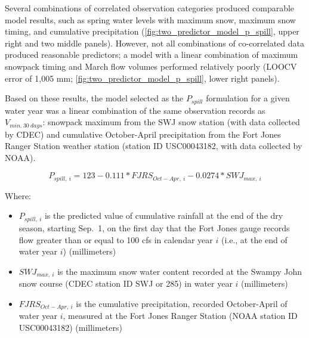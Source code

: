 \documentclass[hess, manuscript]{copernicus}
\providecommand{\tightlist}{%
  \setlength{\itemsep}{0pt}\setlength{\parskip}{0pt}}
\begin{document}
Several combinations of correlated observation categories produced
comparable model results, such as spring water levels with maximum snow,
maximum snow timing, and cumulative precipitation
(\autoref{fig:two_predictor_model_p_spill}, upper right and two middle
panels). However, not all combinations of co-correlated data produced
reasonable predictors; a model with a linear combination of maximum
snowpack timing and March flow volumes performed relatively poorly
(LOOCV error of 1,005 mm; \autoref{fig:two_predictor_model_p_spill},
lower right panels).

Based on these results, the model selected as the \(P_{spill}\)
formulation for a given water year was a linear combination of the same
observation records as \(V_{min.~30~days}\): snowpack maximum from the
SWJ snow station (with data collected by CDEC) and cumulative
October-April precipitation from the Fort Jones Ranger Station weather
station (station ID USC00043182, with data collected by NOAA).

\[P_{spill,~i} = 123 -0.111 * FJRS_{Oct-Apr,~i} - 0.0274* SWJ_{max,~i}\]

Where:

\begin{itemize}
\tightlist
\item
  \(P_{spill,~i}\) is the predicted value of cumulative rainfall at the
  end of the dry season, starting Sep.~1, on the first day that the Fort
  Jones gauge records flow greater than or equal to 100 cfs in calendar
  year \(i\) (i.e., at the end of water year \(i\)) (millimeters)
\item
  \(SWJ_{max,~i}\) is the maximum snow water content recorded at the
  Swampy John snow course (CDEC station ID SWJ or 285) in water year
  \(i\) (millimeters)
\item
  \(FJRS_{Oct-Apr,~i}\) is the cumulative precipitation, recorded
  October-April of water year \(i\), measured at the Fort Jones Ranger
  Station (NOAA station ID USC00043182) (millimeters)
\end{itemize}
\end{document}
